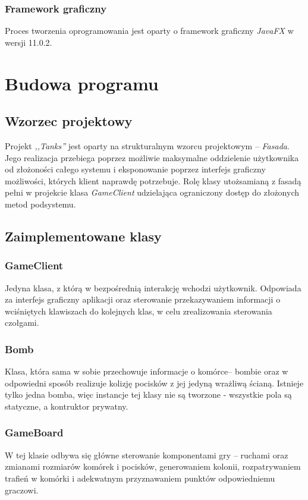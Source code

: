 \documentclass[11pt,a4paper]{report}
\begin{document}
\subsubsection {Framework graficzny}
Proces tworzenia oprogramowania jest oparty o framework graficzny \textsl{JavaFX} w wersji 11.0.2.

\section{Budowa programu}\label{sec:tekst}

\subsection {Wzorzec projektowy}
Projekt \textsl{,,Tanks''} jest oparty na strukturalnym wzorcu projektowym – \textsl{Fasada}. Jego realizacja przebiega poprzez możliwie maksymalne oddzielenie użytkownika od złożoności całego systemu i eksponowanie poprzez interfejs graficzny możliwości, których klient naprawdę potrzebuje. Rolę klasy utożsamianą z fasadą pełni w projekcie klasa \textsl{GameClient} udzielająca ograniczony dostęp do złożonych metod podsystemu. 

\subsection {Zaimplementowane klasy}
\subsubsection{GameClient}
Jedyna klasa, z którą w bezpośrednią interakcję wchodzi użytkownik. Odpowiada za interfejs graficzny aplikacji oraz sterowanie przekazywaniem informacji o wciśniętych klawiszach do kolejnych klas, w celu zrealizowania sterowania czołgami.

\subsubsection{Bomb}
Klasa, która sama w sobie przechowuje informacje o komórce-- bombie oraz w odpowiedni sposób realizuje kolizję pocisków z jej jedyną wrażliwą ścianą. Istnieje tylko jedna bomba, więc instancje tej klasy nie są tworzone - wszystkie pola są statyczne, a kontruktor prywatny.

\subsubsection{GameBoard}
W tej klasie odbywa się główne sterowanie komponentami gry – ruchami oraz zmianami rozmiarów komórek i pocisków, generowaniem kolonii, rozpatrywaniem trafień w komórki i adekwatnym przyznawaniem punktów odpowiedniemu graczowi. 
\end{document}

